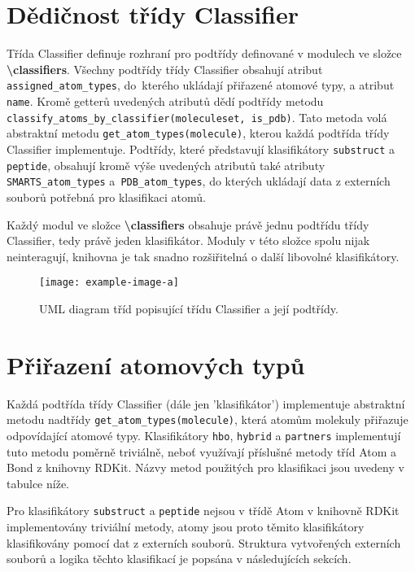 \section{Dědičnost třídy Classifier}
Třída Classifier definuje rozhraní pro podtřídy definované v modulech ve složce \textbf{\textbackslash classifiers}. Všechny podtřídy třídy Classifier obsahují atribut \verb|assigned_atom_types|, do~kterého ukládají přiřazené atomové typy, a atribut \verb|name|. Kromě getterů uvedených atribu\-tů dědí podtřídy metodu \verb|classify_atoms_by_classifier(moleculeset, is_pdb)|. Ta\-to metoda volá abstraktní metodu \verb|get_atom_types(molecule)|, kterou každá podtřída třídy Classifier implementuje. Podtřídy, které představují klasifikátory \verb|substruct| a \verb|peptide|, obsahují kromě výše uvedených atributů také atributy \verb|SMARTS_atom_types| a~\verb|PDB_atom_types|, do kterých ukládají data z externích souborů potřebná pro klasifikaci atomů.

Každý modul ve složce \textbf{\textbackslash classifiers} obsahuje právě jednu podtřídu třídy Classifier, tedy právě jeden klasifikátor. Moduly v této složce spolu nijak neinteragují, knihovna je tak snadno rozšiřitelná o další libovolné klasifikátory. 

\bigskip
\begin{figure}[h]
    \centering
    \texttt{[image: example-image-a]}
    \caption{UML diagram tříd popisující třídu Classifier a její podtřídy.}
    \label{classes_UML}
\end{figure}


\section{Přiřazení atomových typů}
Každá podtřída třídy Classifier (dále jen 'klasifikátor') implementuje abstraktní metodu nadtřídy \verb|get_atom_types(molecule)|, která atomům molekuly přiřazuje odpovídající atomové typy. Klasifikátory \verb|hbo|, \verb|hybrid| a \verb|partners| implementují tuto metodu poměrně triviálně, neboť využívají příslušné metody tříd Atom a Bond z knihovny RDKit. Názvy metod použitých pro klasifikaci jsou uvedeny v tabulce níže.

Pro klasifikátory \verb|substruct| a \verb|peptide| nejsou v třídě Atom v knihovně RDKit implementovány triviální metody, atomy jsou proto těmito klasifikátory klasifikovány pomocí dat z externích souborů. Struktura vytvořených externích souborů a logika těchto klasifikací je popsána v následujících sekcích. 

